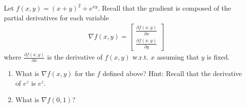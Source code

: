 Let $f(x,y) = \left( x + y \right)^2 + e^{xy}$. Recall that the gradient is composed of the partial derivatives for each variable
\begin{align*}
\nabla f(x,y) = \left[ \begin{array}{c} \frac{\partial f(x,y)}{\partial x} \\ \frac{\partial f(x,y)}{\partial y} \end{array}\right]
\end{align*}
where $\frac{\partial f(x,y)}{\partial x} $ is the derivative of $f(x,y)$ w.r.t. $x$ assuming that $y$ is fixed. 
\begin{enumerate}
\item What is $\nabla f(x,y)$ for the $f$ defined above? Hint: Recall that the derivative of $e^z$ is $e^z$. 
\item What is $\nabla f(0,1)$?
\end{enumerate}

